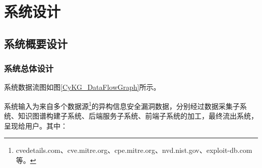 \documentclass[a4paper,AutoFakeBold,oneside,12pt]{book}
\begin{document}
\chapter{系统设计}

\section{系统概要设计}

\subsection{系统总体设计}

系统数据流图如图\ref{CyKG_DataFlowGraph}所示。


系统输入为来自多个数据源\footnote{cvedetails.com、cve.mitre.org、cpe.mitre.org、nvd.nist.gov、exploit-db.com 等。}的异构信息安全漏洞数据，分别经过数据采集子系统、知识图谱构建子系统、后端服务子系统、前端子系统的加工，最终流出系统，呈现给用户。其中：
\end{document}

